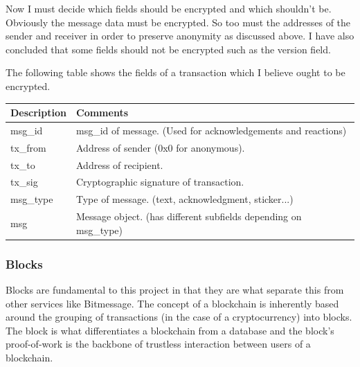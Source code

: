 \documentclass{article}
\begin{document}
Now I must decide which fields should be encrypted and which shouldn't be. Obviously the message data must be encrypted. So too must the addresses of the sender and receiver in order to preserve anonymity as discussed above. I have also concluded that some fields should not be encrypted such as the version field.

The following table shows the fields of a transaction which I believe ought to be encrypted.
\begin{table}[H]
\centering
\begin{tabular}{|p{2.5cm}|p{8.5cm}|}
\hline
\rowcolor{tblgrey}
Description & Comments              \\ \hline
msg\_id     & msg\_id of message. (Used for acknowledgements and reactions)\\ \hline
tx\_from    & Address of sender (0x0 for anonymous).                       \\ \hline
tx\_to      & Address of recipient.                                        \\ \hline
tx\_sig     & Cryptographic signature of transaction.                      \\ \hline
msg\_type   & Type of message. (text, acknowledgment, sticker...)          \\ \hline
msg         & Message object. (has different subfields depending on msg\_type) \\ \hline
\end{tabular}
\end{table}



\subsubsection{Blocks}
Blocks are fundamental to this project in that they are what separate this from other services like Bitmessage. The concept of a blockchain is inherently based around the grouping of transactions (in the case of a cryptocurrency) into blocks. The block is what differentiates a blockchain from a database and the block's proof-of-work is the backbone of trustless interaction between users of a blockchain.
\end{document}
